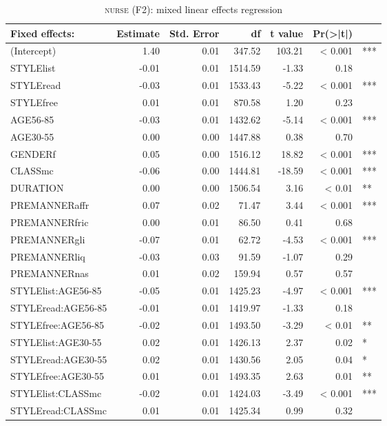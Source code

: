 {
	\footnotesize
	\begin{longtable}[c]{p{}rrrrrl}
		\caption{\textsc{nurse} (F2): mixed linear effects regression}\label{tab.regression.nurse.f2}\\
		\lsptoprule
		Fixed effects: & Estimate & Std. Error & df & t value & Pr(>|t|) & \\ 
		\midrule{}
		(Intercept) & 1.40 & 0.01 & 347.52 & 103.21 & < 0.001 & *** \\ 
		STYLElist & -0.01 & 0.01 & 1514.59 & -1.33 & 0.18 & \\ 
		STYLEread & -0.03 & 0.01 & 1533.43 & -5.22 & < 0.001 & *** \\ 
		STYLEfree & 0.01 & 0.01 & 870.58 & 1.20 & 0.23 & \\ 
		AGE56-85 & -0.03 & 0.01 & 1432.62 & -5.14 & < 0.001 & *** \\ 
		AGE30-55 & 0.00 & 0.00 & 1447.88 & 0.38 & 0.70 & \\ 
		GENDERf & 0.05 & 0.00 & 1516.12 & 18.82 & < 0.001 & *** \\ 
		CLASSmc & -0.06 & 0.00 & 1444.81 & -18.59 & < 0.001 & *** \\ 
		DURATION & 0.00 & 0.00 & 1506.54 & 3.16 & < 0.01 & ** \\ 
		PREMANNERaffr & 0.07 & 0.02 & 71.47 & 3.44 & < 0.001 & *** \\ 
		PREMANNERfric & 0.00 & 0.01 & 86.50 & 0.41 & 0.68 & \\ 
		PREMANNERgli & -0.07 & 0.01 & 62.72 & -4.53 & < 0.001 & *** \\ 
		PREMANNERliq & -0.03 & 0.03 & 91.59 & -1.07 & 0.29 & \\ 
		PREMANNERnas & 0.01 & 0.02 & 159.94 & 0.57 & 0.57 & \\ 
		STYLElist:AGE56-85 & -0.05 & 0.01 & 1425.23 & -4.97 & < 0.001 & *** \\ 
		STYLEread:AGE56-85 & -0.01 & 0.01 & 1419.97 & -1.33 & 0.18 & \\ 
		STYLEfree:AGE56-85 & -0.02 & 0.01 & 1493.50 & -3.29 & < 0.01 & ** \\ 
		STYLElist:AGE30-55 & 0.02 & 0.01 & 1426.13 & 2.37 & 0.02 & * \\ 
		STYLEread:AGE30-55 & 0.02 & 0.01 & 1430.56 & 2.05 & 0.04 & * \\ 
		STYLEfree:AGE30-55 & 0.01 & 0.01 & 1493.35 & 2.63 & 0.01 & **\\ 
		STYLElist:CLASSmc & -0.02 & 0.01 & 1424.03 & -3.49 & < 0.001 & *** \\ 
		STYLEread:CLASSmc & 0.01 & 0.01 & 1425.34 & 0.99 & 0.32 & \\ 

\end{longtable}}
